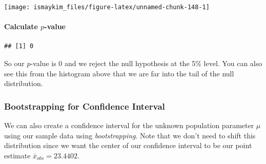 \documentclass[]{tufte-book}
\newenvironment{Shaded}{\begin{snugshade}}{\end{snugshade}}
\newcommand{\KeywordTok}[1]{\textcolor[rgb]{0.13,0.29,0.53}{\textbf{{#1}}}}
\newcommand{\DataTypeTok}[1]{\textcolor[rgb]{0.13,0.29,0.53}{{#1}}}
\newcommand{\DecValTok}[1]{\textcolor[rgb]{0.00,0.00,0.81}{{#1}}}
\newcommand{\StringTok}[1]{\textcolor[rgb]{0.31,0.60,0.02}{{#1}}}
\newcommand{\OtherTok}[1]{\textcolor[rgb]{0.56,0.35,0.01}{{#1}}}
\newcommand{\NormalTok}[1]{{#1}}
\theoremstyle{definition}
\theoremstyle{definition}
\theoremstyle{remark}
\begin{document}
\begin{center}\texttt{[image: ismaykim\_files/figure-latex/unnamed-chunk-148-1]} \end{center}

\paragraph{\texorpdfstring{Calculate
\(p\)-value}{Calculate p-value}}\label{calculate-p-value}

\begin{Shaded}
\end{Shaded}

\begin{verbatim}
## [1] 0
\end{verbatim}

So our \(p\)-value is 0 and we reject the null hypothesis at the 5\%
level. You can also see this from the histogram above that we are far
into the tail of the null distribution.

\subsubsection{Bootstrapping for Confidence
Interval}\label{bootstrapping-for-confidence-interval}

We can also create a confidence interval for the unknown population
parameter \(\mu\) using our sample data using \emph{bootstrapping}. Note
that we don't need to shift this distribution since we want the center
of our confidence interval to be our point estimate
\(\bar{x}_{obs} = 23.4402\).

\begin{Shaded}
\end{Shaded}
\end{document}
